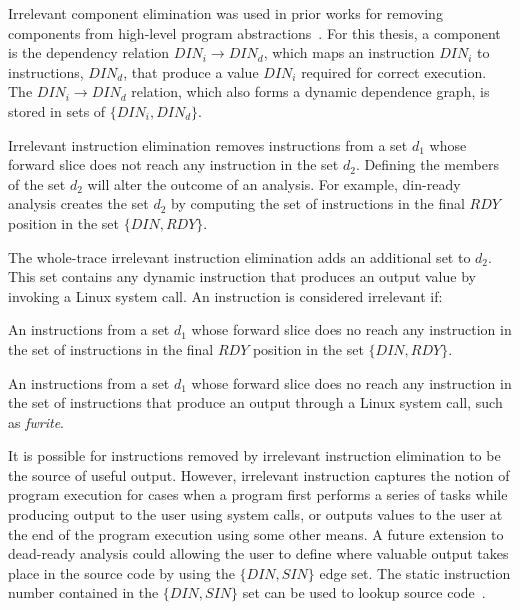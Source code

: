 {%

Irrelevant component elimination was used in prior works for removing components from high-level program abstractions~\cite{corbett:icsc:2000}.  For this thesis, a component is the dependency relation $DIN_i \rightarrow DIN_d$, which maps an instruction $DIN_i$ to instructions, $DIN_d$, that produce a value $DIN_i$ required for correct execution.  The $DIN_i \rightarrow DIN_d$ relation, which also forms a dynamic dependence graph, is stored in sets of $\{DIN_i,DIN_d\}$.

Irrelevant instruction elimination removes instructions from a set $d_1$ whose forward slice does not reach any instruction in the set $d_2$.  Defining the members of the set $d_2$ will alter the outcome of an analysis.  For example, din-ready analysis creates the set $d_2$ by computing the set of instructions in the final $RDY$ position in the set $\{DIN,RDY\}$.

The whole-trace irrelevant instruction elimination adds an additional set to $d_2$. This set contains any dynamic instruction that produces an output value by invoking a Linux system call.  An instruction is considered irrelevant if:

\begin{itemize} An instructions from a set $d_1$ whose forward slice does no
 reach any instruction in the set of instructions in the final $RDY$ position in the set $\{DIN,RDY\}$.

 An instructions from a set $d_1$ whose forward slice does no
 reach any instruction in the set of instructions that produce an output through a Linux system call, such as \textit{fwrite}. \end{itemize}

It is possible for instructions removed by irrelevant instruction elimination to be the source of useful output.  However, irrelevant instruction captures the notion of program execution for cases when a program first performs a series of tasks while producing output to the user using system calls, or outputs values to the user at the end of the program execution using some other means. A future extension to dead-ready analysis could allowing the user to define where valuable output takes place in the source code by using the $\{DIN,SIN\}$ edge set.  The static instruction number contained in the $\{DIN,SIN\}$ set can be used to lookup source code~\cite{price:08:pact}.

}
